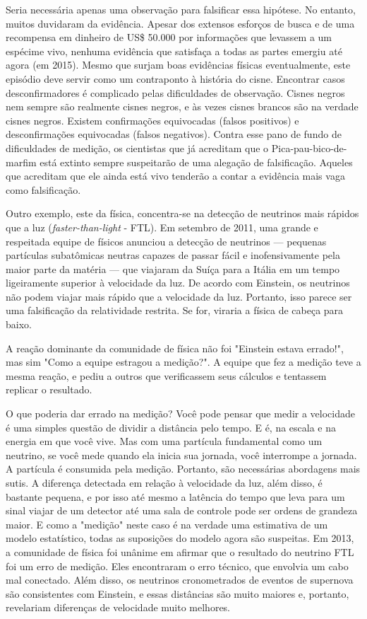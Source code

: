 Seria necessária apenas uma observação para falsificar essa hipótese. No entanto, muitos duvidaram da evidência. Apesar dos extensos esforços de busca e de uma recompensa em dinheiro de US\$ 50.000 por informações que levassem a um espécime vivo, nenhuma evidência que satisfaça a todas as partes emergiu até agora (em 2015). Mesmo que surjam boas evidências físicas eventualmente, este episódio deve servir como um contraponto à história do cisne. Encontrar casos desconfirmadores é complicado pelas dificuldades de observação. Cisnes negros nem sempre são realmente cisnes negros, e às vezes cisnes brancos são na verdade cisnes negros. Existem confirmações equivocadas (falsos positivos) e desconfirmações equivocadas (falsos negativos). Contra esse pano de fundo de dificuldades de medição, os cientistas que já acreditam que o Pica-pau-bico-de-marfim está extinto sempre suspeitarão de uma alegação de falsificação. Aqueles que acreditam que ele ainda está vivo tenderão a contar a evidência mais vaga como falsificação.

Outro exemplo, este da física, concentra-se na detecção de neutrinos mais rápidos que a luz (\textit{faster-than-light} - FTL). Em setembro de 2011, uma grande e respeitada equipe de físicos anunciou a detecção de neutrinos — pequenas partículas subatômicas neutras capazes de passar fácil e inofensivamente pela maior parte da matéria — que viajaram da Suíça para a Itália em um tempo ligeiramente superior à velocidade da luz. De acordo com Einstein, os neutrinos não podem viajar mais rápido que a velocidade da luz. Portanto, isso parece ser uma falsificação da relatividade restrita. Se for, viraria a física de cabeça para baixo.

A reação dominante da comunidade de física não foi "Einstein estava errado!", mas sim "Como a equipe estragou a medição?". A equipe que fez a medição teve a mesma reação, e pediu a outros que verificassem seus cálculos e tentassem replicar o resultado.

O que poderia dar errado na medição? Você pode pensar que medir a velocidade é uma simples questão de dividir a distância pelo tempo. E é, na escala e na energia em que você vive. Mas com uma partícula fundamental como um neutrino, se você mede quando ela inicia sua jornada, você interrompe a jornada. A partícula é consumida pela medição. Portanto, são necessárias abordagens mais sutis. A diferença detectada em relação à velocidade da luz, além disso, é bastante pequena, e por isso até mesmo a latência do tempo que leva para um sinal viajar de um detector até uma sala de controle pode ser ordens de grandeza maior. E como a "medição" neste caso é na verdade uma estimativa de um modelo estatístico, todas as suposições do modelo agora são suspeitas. Em 2013, a comunidade de física foi unânime em afirmar que o resultado do neutrino FTL foi um erro de medição. Eles encontraram o erro técnico, que envolvia um cabo mal conectado. Além disso, os neutrinos cronometrados de eventos de supernova são consistentes com Einstein, e essas distâncias são muito maiores e, portanto, revelariam diferenças de velocidade muito melhores.

